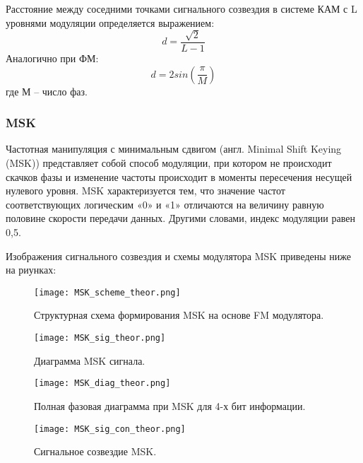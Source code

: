 Расстояние между соседними точками сигнального созвездия в системе КАМ с L уровнями модуляции определяется выражением: 
\begin{equation}
	d = \frac {\sqrt{2}}{L - 1}
\end{equation}
Аналогично при ФМ:
\begin{equation}
	d = 2 sin(\frac{\pi}{M})
\end{equation}
где М – число фаз.

\subsubsection{MSK}
Частотная манипуляция с минимальным сдвигом (англ. Minimal Shift Keying (MSK)) представляет собой способ модуляции, при котором не происходит скачков фазы и изменение частоты происходит в моменты пересечения несущей нулевого уровня. MSK характеризуется тем, что значение частот соответствующих логическим «0» и «1» отличаются на величину равную половине скорости передачи данных. Другими словами, индекс модуляции равен 0,5.

Изображения сигнального созвездия и схемы модулятора MSK приведены ниже на риунках:
\begin{figure}[H]
	\begin{center}
		\texttt{[image: MSK\_scheme\_theor.png]}
		\caption{Структурная схема формирования MSK на основе FM модулятора.} %
		\label{MSK_scheme_theor} %
	\end{center}
\end{figure}
\begin{figure}[H]
	\begin{center}
		\texttt{[image: MSK\_sig\_theor.png]}
		\caption{Диаграмма MSK сигнала.} %
		\label{MSK_sig_theor} %
	\end{center}
\end{figure}

\begin{figure}[H]
	\begin{center}
		\texttt{[image: MSK\_diag\_theor.png]}
		\caption{Полная фазовая диаграмма при MSK для 4-х бит информации.} %
		\label{MSK_diag_theor} %
	\end{center}
\end{figure}
\begin{figure}[H]
	\begin{center}
		\texttt{[image: MSK\_sig\_con\_theor.png]}
		\caption{Сигнальное созвездие MSK.} %
		\label{MSK_sig_con_theor} %
	\end{center}
\end{figure}

